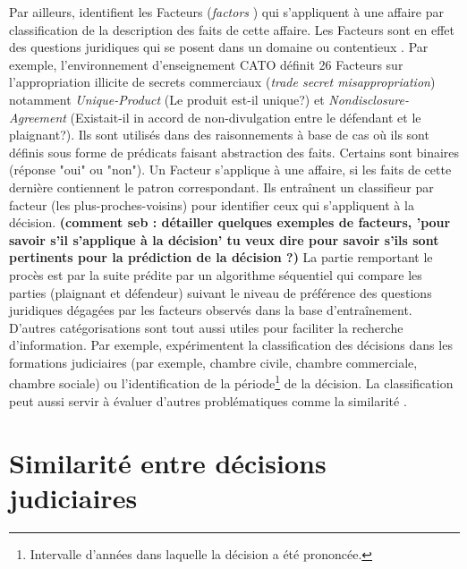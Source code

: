Par ailleurs, \cite{Ashley2009classifCases} identifient les \og Facteurs \fg{} (\textit{factors} \citep{ashley1990modeling_factors}) qui s'appliquent à une affaire par classification de la description des faits de cette affaire. Les Facteurs sont en effet des questions juridiques qui se posent dans un domaine ou contentieux \citep{bench1997arguingwithwases_factors}. Par exemple, l'environnement d'enseignement CATO définit 26 Facteurs sur l'appropriation illicite de secrets commerciaux  (\textit{trade secret misappropriation}) notamment \textit{Unique-Product} (Le produit est-il unique?) et \textit{Nondisclosure-Agreement} (Existait-il in accord de non-divulgation entre le défendant et le plaignant?). Ils sont utilisés dans des raisonnements à base de cas où ils sont définis sous forme de prédicats faisant abstraction des faits. Certains sont binaires (réponse "oui" ou "non"). Un Facteur s'applique à une affaire, si les faits de cette dernière contiennent le patron correspondant. Ils entraînent un classifieur par facteur (les plus-proches-voisins) pour identifier ceux qui s'appliquent à la décision. 
\textbf{(comment seb : détailler quelques exemples de facteurs, 'pour savoir s'il s'applique à la décision' tu veux dire pour savoir s'ils sont pertinents pour la prédiction de la décision ?)} 
La partie remportant le procès est par la suite prédite par un algorithme séquentiel qui compare les parties (plaignant et défendeur) suivant le niveau de préférence des questions juridiques dégagées par les facteurs observés dans la base d'entraînement. D'autres catégorisations sont tout aussi utiles pour faciliter la recherche d'information. Par exemple, \citet{Sulea2017predictareadecision,sulea2017legalEnsSVM} expérimentent la classification des décisions dans les formations judiciaires (par exemple, chambre civile, chambre commerciale, chambre sociale) ou l'identification de la période\footnote{Intervalle d'années dans laquelle la décision a été prononcée.} de la décision. 
 La classification peut aussi servir à évaluer d'autres problématiques comme la similarité \citep{ma2018wmdchinesecase}.

\section{Similarité entre décisions judiciaires}

